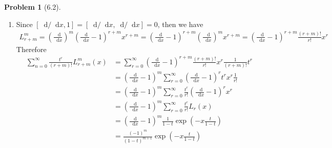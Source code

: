 \documentclass[twoside,11pt]{article}
\renewcommand*\d{\mathop{}\!\mathrm{d}}
\theoremstyle{definition}
\newtheorem{problem}{Problem}
\theoremstyle{remark}
\begin{document}
\begin{problem}[6.2]
\begin{enumerate}[label=(\alph*)]
        \item Since $[\d/\d x, 1]=[\d/\d x, \d/\d x]=0$, then we have
        \begin{align*}
            L_{r+m}^m = \left(\frac{\d}{\d x}\right)^m \left(
                \frac{\d }{\d x}-1
            \right)^{r+m}  x^{r+m}
            =  \left(
                \frac{\d }{\d x}-1
            \right)^{r+m} \left(\frac{\d}{\d x}\right)^m x^{r+m}
            = \left(
                \frac{\d }{\d x}-1
            \right)^{r+m} \frac{(r+m)!}{r!} x^r
        \end{align*}
        Therefore
        \begin{align*}
            \sum_{n=0}^\infty \frac{t^r}{(r+m)!}L_{r+m}^m(x)
            &= \sum_{r=0}^\infty \left(\frac{\d }{\d x} - 1\right)^{r+m}\frac{(r+m)!}{r!} x^r\frac{1}{(r+m)!}t^r\\
            &= \left(\frac{\d }{\d x} - 1\right)^m \sum_{r=0}^\infty\left(\frac{\d }{\d x} - 1\right)^r t^rx^r\frac{1}{r!}\\
            &= \left(\frac{\d }{\d x} - 1\right)^m \sum_{r=0}^\infty\frac{t^r}{r!}\left(\frac{\d }{\d x} - 1\right)^r x^r\\
            &= \left(\frac{\d }{\d x} - 1\right)^m \sum_{r=0}^\infty \frac{t^r}{r!} L_r(x) \\
            &= \left(\frac{\d }{\d x} - 1\right)^m \frac{1}{1-t}\exp\left(-x\frac{t}{1-t}\right)\\
            &= \frac{(-1)^m}{(1-t)^{m+1}}\exp\left(-x\frac{t}{1-t}\right)
        \end{align*}

    \end{enumerate}
\end{problem}








\end{document}
